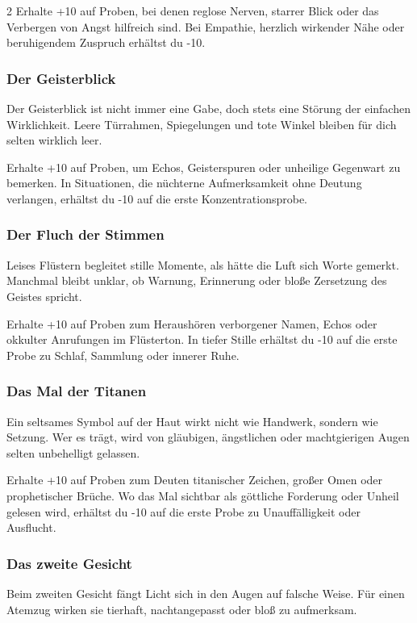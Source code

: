 {\begin{multicols*}{2}
        \malspielwertebox
        {Erhalte +10 auf Proben, bei denen reglose Nerven, starrer Blick oder das Verbergen von Angst hilfreich sind.}
        {Bei Empathie, herzlich wirkender Nähe oder beruhigendem Zuspruch erhältst du -10.}

        \subsubsection*{Der Geisterblick}
        Der Geisterblick ist nicht immer eine Gabe, doch stets eine Störung der einfachen Wirklichkeit. Leere Türrahmen, Spiegelungen und tote Winkel bleiben für dich selten wirklich leer.

        \malspielwertebox
        {Erhalte +10 auf Proben, um Echos, Geisterspuren oder unheilige Gegenwart zu bemerken.}
        {In Situationen, die nüchterne Aufmerksamkeit ohne Deutung verlangen, erhältst du -10 auf die erste Konzentrationsprobe.}

        \subsubsection*{Der Fluch der Stimmen}
        Leises Flüstern begleitet stille Momente, als hätte die Luft sich Worte gemerkt. Manchmal bleibt unklar, ob Warnung, Erinnerung oder bloße Zersetzung des Geistes spricht.

        \malspielwertebox
        {Erhalte +10 auf Proben zum Heraushören verborgener Namen, Echos oder okkulter Anrufungen im Flüsterton.}
        {In tiefer Stille erhältst du -10 auf die erste Probe zu Schlaf, Sammlung oder innerer Ruhe.}

        \subsubsection*{Das Mal der Titanen}
        Ein seltsames Symbol auf der Haut wirkt nicht wie Handwerk, sondern wie Setzung. Wer es trägt, wird von gläubigen, ängstlichen oder machtgierigen Augen selten unbehelligt gelassen.

        \malspielwertebox
        {Erhalte +10 auf Proben zum Deuten titanischer Zeichen, großer Omen oder prophetischer Brüche.}
        {Wo das Mal sichtbar als göttliche Forderung oder Unheil gelesen wird, erhältst du -10 auf die erste Probe zu Unauffälligkeit oder Ausflucht.}

        \subsubsection*{Das zweite Gesicht}
        Beim zweiten Gesicht fängt Licht sich in den Augen auf falsche Weise. Für einen Atemzug wirken sie tierhaft, nachtangepasst oder bloß zu aufmerksam.


\end{multicols*}}
